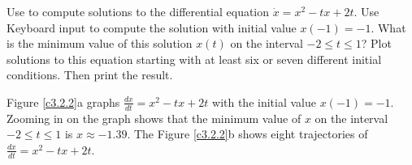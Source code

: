 \documentclass{ximera}
\begin{document}
\begin{computerExercise} \label{c3.2.2}
Use {\dfield} to compute solutions to the differential equation
$\dot{x} = x^2-tx+2t$. Use {\sf Keyboard input} to compute the solution
with initial value $x(-1)=-1$.  What is the minimum value of this
solution $x(t)$ on the interval $-2\leq t\leq 1$?  Plot
solutions to this equation starting with at least six or seven
different initial conditions. Then print the result.

\begin{solution}

Figure \ref{c3.2.2}a graphs $\frac{dx}{dt} = x^2 -tx +2t$ with the
initial value $x(-1) = -1$.  Zooming in on the graph shows that the
minimum value of $x$ on the interval $-2 \leq t \leq 1$ is $x \approx
-1.39$.  The Figure \ref{c3.2.2}b shows eight trajectories of
$\frac{dx}{dt} = x^2 -tx +2t$.

\begin{figure}[htb]
                       \centerline{%
                       }
\end{figure}

\end{solution}
\end{computerExercise}
\end{document}
